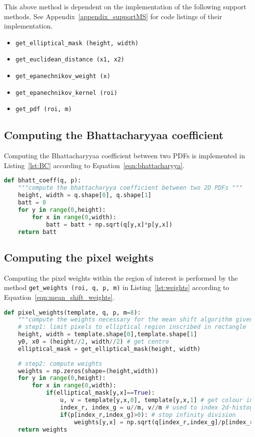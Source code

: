 This above method is dependent on the implementation of the following support
methods. See Appendix~\ref{appendix_supportMS} for code listings of their implementation.
\begin{itemize}
    \item \lstinline{get_elliptical_mask (height, width)}
    \item \lstinline{get_euclidean_distance (x1, x2)}
    \item \lstinline{get_epanechnikov_weight (x)}
    \item \lstinline{get_epanechnikov_kernel (roi)}
    \item \lstinline{get_pdf (roi, m)}
\end{itemize}

\subsection{Computing the Bhattacharyyaa coefficient}
Computing the Bhattacharyyaa coefficient between two PDFs is implemented in
Listing~\ref{lst:BC} according to Equation~\ref{eqn:bhattacharyya}. 

\begin{lstlisting}[language=Python, caption={Function computing the Bhattacharyya coefficient}, captionpos=b, label={lst:BC}]
def bhatt_coeff(q, p):
    """compute the bhattacharyya coefficient between two 2D PDFs """
    height, width = q.shape[0], q.shape[1]
    batt = 0
    for y in range(0,height):
        for x in range(0,width):
            batt = batt + np.sqrt(q[y,x]*p[y,x])
    return batt
\end{lstlisting}

\subsection{Computing the pixel weights}
Computing the pixel weights within the region of interest is performed by the
method \lstinline{get_weights (roi, q, p, m)} in Listing~\ref{lst:weights} according to Equation~\ref{eqn:mean_shift_weights}.

\begin{lstlisting}[language=Python, caption={Function computing kernel Weights}, captionpos=b, label={lst:weights}]
def pixel_weights(template, q, p, m=8):
    """compute the weights necessary for the mean shift algorithm given q and p"""
    # step1: limit pixels to elliptical region inscribed in rectangle
    height, width = template.shape[0],template.shape[1]
    y0, x0 = (height//2, width//2) # get centre 
    elliptical_mask = get_elliptical_mask(height, width)
    
    # step2: compute weights
    weights = np.zeros(shape=(height,width))
    for y in range(0,height):
        for x in range(0,width): 
            if(elliptical_mask[y,x]==True):  
                u, v = template[y,x,0], template[y,x,1] # get colour index, u 
                index_r, index_g = u//m, v//m # used to index 2d-histogram
                if(p[index_r,index_g]>0): # stop infinity division
                    weights[y,x] = np.sqrt(q[index_r,index_g]/p[index_r,index_g]) # comp weight
    return weights 
\end{lstlisting}

